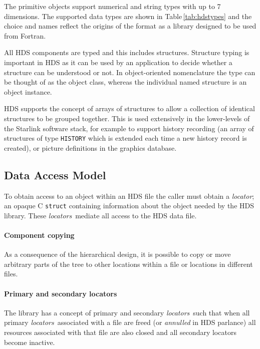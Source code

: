 \documentclass[final,authoryear,5p,times,twocolumn]{elsarticle}
\newcommand{\locator}{\emph{locator}}
\newcommand{\locators}{\emph{locators}}
\begin{document}
The primitive objects support numerical and string types with up to 7
dimensions. The supported data types are shown in
Table\,\ref{tab:hdstypes} and the choice and names reflect the origins
of the format as a library designed to be used from Fortran.

All HDS components are typed and this includes structures. Structure
typing is important in HDS as it can be used by an application to
decide whether a structure can be understood or not. In object-oriented
nomenclature the type can be thought of as the object class, whereas the
individual named structure is an object instance.

HDS supports the concept of arrays of structures to allow a collection
of identical structures to be grouped together. This is used
extensively in the lower-levels of the Starlink software stack, for example to
support history recording (an array of structures of type
\texttt{HISTORY} which is extended each time a new history record is
created), or picture definitions in the graphics database.

\subsection{Data Access Model}

To obtain access to an object within an HDS file the caller must
obtain a \locator; an opaque C \texttt{struct} containing information
about the object needed by the HDS library. These \locators\ mediate
all access to the HDS data file.

\paragraph{Component copying}

As a consequence of the hierarchical design, it is possible to copy or
move arbitrary parts of the tree to other locations within a file or
locations in different files.

\paragraph{Primary and secondary locators}

The library has a concept of primary and secondary \locators\ such that
when all primary \locators\ associated with a file are freed (or
\emph{annulled} in HDS parlance) all resources associated with that
file are also closed and all secondary locators become inactive.
\end{document}
